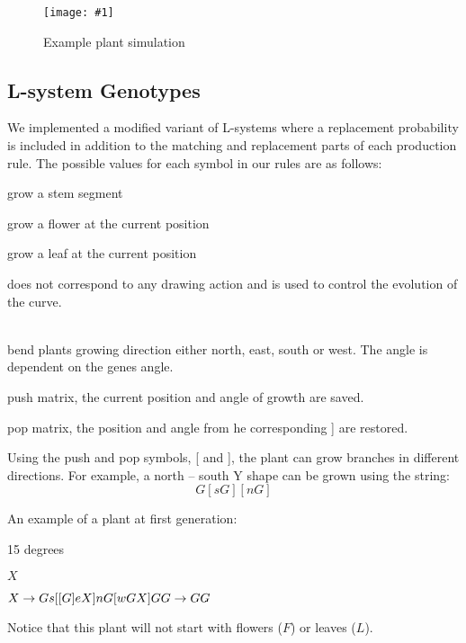 \documentclass[conference]{acmsiggraph}
\newcommand{\onecol}[3]{
  \begin{figure}
    \centering
    \texttt{[image: \#1]}
    \vspace{0.0in}%
    \caption{#3}
    \label{#2}
  \end{figure}
}
\begin{document}
\onecol{images/screenshot.png}{screen}{Example plant simulation}

\subsection{L-system Genotypes}

We implemented a modified variant of L-systems where a replacement probability
is included in addition to the matching and replacement parts of each production
rule. The possible values for each symbol in our rules are as follows:

\begin{description}[leftmargin=!,labelindent=0.2in,labelwidth=0.1in]
  \item[G]   grow a stem segment
  \item[F]   grow a flower at the current position
  \item[L]   grow a leaf at the current position
  \item[X]   does not correspond to any drawing action and is used to control
             the evolution of the curve.\cite{lsystems}
  \item[n, e, s, w] \hfill \\
             bend plants growing direction either north, east, south or west.
             The angle is dependent on the genes angle.
  \item[{[}] push matrix, the current position and angle of growth are saved.
  \item[{]}] pop matrix, the position and angle from he corresponding {]} are
             restored.
\end{description}

Using the push and pop symbols, {[} and {]}, the plant can grow branches in
different directions. For example, a north -- south Y shape can be grown using
the string: \[ G [ s G ] [ n G ] \]

An example of a plant at first generation:

\begin{description}[leftmargin=!,labelindent=0.2in,labelwidth=0.4in]
  \item[Angle] 15 degrees
  \item[Axiom] $ X $
  \item[Rules] $ X \rightarrow Gs[[G]eX]nG[wGX]G \\
                 G \rightarrow GG $
\end{description}

Notice that this plant will not start with flowers ($F$) or leaves ($L$).
\end{document}
